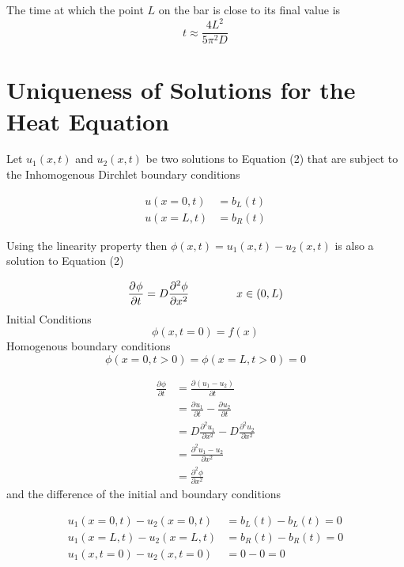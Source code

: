 \documentclass[a4paper]{article}
\newcommand*{\pd}[3][]{\ensuremath{\frac{\partial^{#1} #2}{\partial #3}}}
\begin{document}
The time at which the point $L$ on the bar is close to its final value is 
\begin{equation}
 t \approx \frac{4L^{2}}{5\pi^{2}D}
\end{equation}



\section{Uniqueness of Solutions for the Heat Equation}

Let $u_{1}(x, t)$ and $u_{2}(x, t)$ be two solutions to Equation (2) that are subject to the Inhomogenous
Dirchlet boundary conditions

\begin{align*}
 u(x = 0, t) &= b_{L}(t)  \\
 u(x = L, t) &= b_{R}(t)  
\end{align*}

Using the linearity property then $\phi(x, t) = u_{1}(x, t) - u_{2}(x, t) $ is also a solution to Equation (2)

\begin{equation}
\pd{\phi}{t}=D\pd[2]{\phi}{x^2} \hspace{15mm} x \in (0, L)
\end{equation}
Initial Conditions 
\begin{equation}
\phi(x,t = 0) = f(x) 
\end{equation}
Homogenous boundary conditions
\begin{equation}
\phi(x = 0, t > 0) = \phi(x = L, t > 0) = 0
\end{equation}

\begin{align*}
\pd{\phi}{t} &= \pd{(u_{1} - u_{2})}{t}  \\
&= \pd{u_{1}}{t} - \pd{u_{2}}{t}  \\
&= D\pd[2]{u_{1}}{x^{2}} - D\pd[2]{u_{2}}{x^{2}}  \\
&= \pd[2]{u_{1} - u_{2}}{x^{2}}  \\
&= \pd[2]{\phi}{x^2}
\end{align*}
and the difference of the initial and boundary conditions

\begin{align*}
 u_{1}(x = 0, t) - u_{2}(x = 0, t) &= b_{L}(t) - b_{L}(t) = 0 \\
 u_{1}(x = L, t) - u_{2}(x = L, t) &= b_{R}(t) - b_{R}(t) = 0 \\
 u_{1}(x, t = 0) - u_{2}(x, t = 0) &= 0 - 0 = 0
\end{align*}
\end{document}
